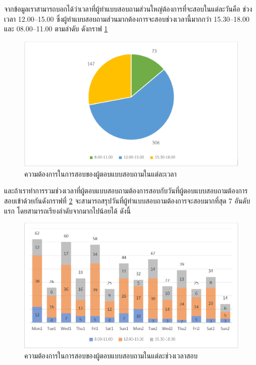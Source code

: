 จากข้อมูลเราสามารถบอกได้ว่าเวลาที่ผู้ทำแบบสอบถามส่วนใหญ่ต้องการที่จะสอบในแต่ละวันคือ
ช่วงเวลา 12.00--15.00 ซึ่งผู้ทำแบบสอบถามส่วนมากต้องการจะสอบช่วงเวลานี้มากกว่า 15.30--18.00 และ 08.00--11.00 ตามลำดับ ดังกราฟ \ref{fig:time}
\begin{figure}
  \begin{center}
    \includegraphics[width=\linewidth]{images/pie_chart_for_final_exam_time.png}
  \end{center}
  \caption{ความต้องการในการสอบของผู้ตอบแบบสอบถามในแต่ละเวลา}
  \label{fig:time}
\end{figure}
และถ้าเราทำการรวมช่วงเวลาที่ผู้ตอบแบบสอบถามต้องการสอบกับวันที่ผู้ตอบแบบสอบถามต้องการสอบเข้าด้วยกันดังกราฟที่ \ref{fig:time_slot} จะสามารถสรุปวันที่ผู้ทำแบบสอบถามต้องการจะสอบมากที่สุด 7 อันดับแรก โดยสามารถเรียงลำดับจากมากไปน้อยได้ ดังนี้
\begin{figure}
  \begin{center}
    \includegraphics[width=\linewidth]{images/bar_chart_for_final_exam_slot.png}
  \end{center}
  \caption[ความต้องการในการสอบของผู้ตอบแบบสอบถามในแต่ละช่วงเวลาสอบ]{ความต้องการในการสอบของผู้ตอบแบบสอบถามในแต่ละช่วงเวลาสอบ}
  \label{fig:time_slot}     
\end{figure}
